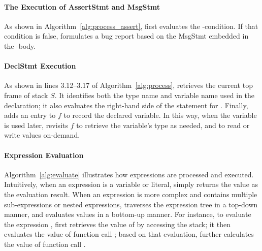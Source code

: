 \paragraph*{\textbf{The Execution of AssertStmt and MsgStmt}}
As shown in Algorithm~\ref{alg:process_assert}, \tool first evaluates the -condition. If that condition is  %
false, \tool formulates a bug report based on the MsgStmt embedded in the -body. %




\paragraph*{\textbf{DeclStmt Execution}} As shown in lines 3.12--3.17 of Algorithm~\ref{alg:process}, \tool retrieves the current top frame of stack $S$. It identifies both the type name  and variable name  used in the declaration; it also evaluates the right-hand side of the statement for . Finally, \tool adds an entry  to $f$ to record the declared variable. In this way, when the variable is used later, \tool revisits $f$ to retrieve the variable's type as needed, and to read or write values on-demand.

\paragraph*{\textbf{Expression Evaluation}}
Algorithm~\ref{alg:evaluate} illustrates how expressions are processed and executed.
Intuitively, 
when an expression is a variable or literal, \tool simply returns the value as the evaluation result. When an expression is more complex and contains multiple sub-expressions or nested expressions, \tool traverses the expression tree in a top-down manner, and evaluates values in a bottom-up manner. For instance, to evaluate the expression , \tool first retrieves the value of  by accessing the stack; it then evaluates the value of function call ; based on that evaluation, \tool further calculates the value of function call .

